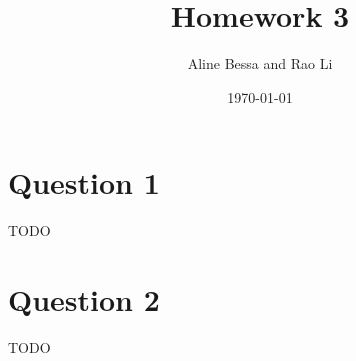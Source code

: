 \documentclass[leqno]{article}
\title{Homework 3}
\author{Aline Bessa and Rao Li}
\date\today
\begin{document}
\maketitle %

\section*{Question 1} TODO

\hfill

\section*{Question 2} TODO 

\hfill
\end{document}
